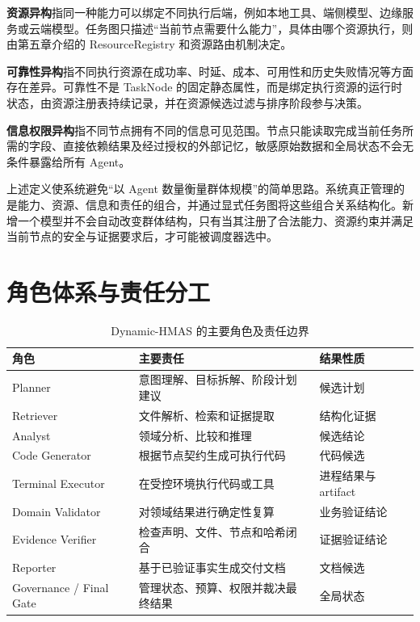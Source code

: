 \documentclass[UTF8,a4paper,12pt,oneside]{ctexbook}
\begin{document}
\textbf{资源异构}指同一种能力可以绑定不同执行后端，例如本地工具、端侧模型、边缘服务或云端模型。任务图只描述“当前节点需要什么能力”，具体由哪个资源执行，则由第五章介绍的 ResourceRegistry 和资源路由机制决定。

\textbf{可靠性异构}指不同执行资源在成功率、时延、成本、可用性和历史失败情况等方面存在差异。可靠性不是 TaskNode 的固定静态属性，而是绑定执行资源的运行时状态，由资源注册表持续记录，并在资源候选过滤与排序阶段参与决策。

\textbf{信息权限异构}指不同节点拥有不同的信息可见范围。节点只能读取完成当前任务所需的字段、直接依赖结果及经过授权的外部记忆，敏感原始数据和全局状态不会无条件暴露给所有 Agent。

上述定义使系统避免“以 Agent 数量衡量群体规模”的简单思路。系统真正管理的是能力、资源、信息和责任的组合，并通过显式任务图将这些组合关系结构化。新增一个模型并不会自动改变群体结构，只有当其注册了合法能力、资源约束并满足当前节点的安全与证据要求后，才可能被调度器选中。


\section{角色体系与责任分工}

\begin{table}[htbp]
\centering
\caption{Dynamic-HMAS 的主要角色及责任边界}
\label{tab:agent-role-responsibility}
\begin{tabular}{p{}p{}p{}}
\toprule
角色 & 主要责任 & 结果性质\\
\midrule
Planner & 意图理解、目标拆解、阶段计划建议 & 候选计划\\
Retriever & 文件解析、检索和证据提取 & 结构化证据\\
Analyst & 领域分析、比较和推理 & 候选结论\\
Code Generator & 根据节点契约生成可执行代码 & 代码候选\\
Terminal Executor & 在受控环境执行代码或工具 & 进程结果与 artifact\\
Domain Validator & 对领域结果进行确定性复算 & 业务验证结论\\
Evidence Verifier & 检查声明、文件、节点和哈希闭合 & 证据验证结论\\
Reporter & 基于已验证事实生成交付文档 & 文档候选\\
Governance / Final Gate & 管理状态、预算、权限并裁决最终结果 & 全局状态\\
\bottomrule
\end{tabular}
\end{table}
\end{document}
